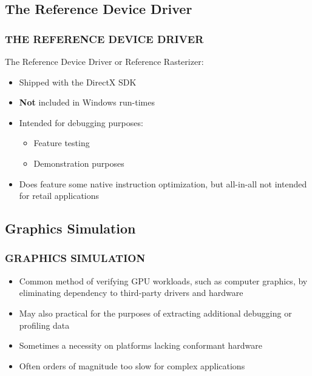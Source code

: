 \subsection{The Reference Device Driver}
\begin{frame}
\frametitle{THE REFERENCE DEVICE DRIVER}

The Reference Device Driver or Reference Rasterizer:
\begin{itemize}
\item Shipped with the DirectX SDK
\item \textbf{Not} included in Windows run-times
\item Intended for debugging purposes:
  \begin{itemize}
  \item Feature testing
  \item Demonstration purposes
  \end{itemize}
\item Does feature some native instruction optimization, but all-in-all not intended for retail applications
\end{itemize}

\end{frame}

\subsection{Graphics Simulation}
\begin{frame}
\frametitle{GRAPHICS SIMULATION}

\begin{itemize}
\item Common method of verifying GPU workloads, such as computer graphics, by eliminating dependency to third-party drivers and hardware
\item May also practical for the purposes of extracting additional debugging or profiling data
\item Sometimes a necessity on platforms lacking conformant hardware
\item Often orders of magnitude too slow for complex applications
\end{itemize}

\end{frame}

